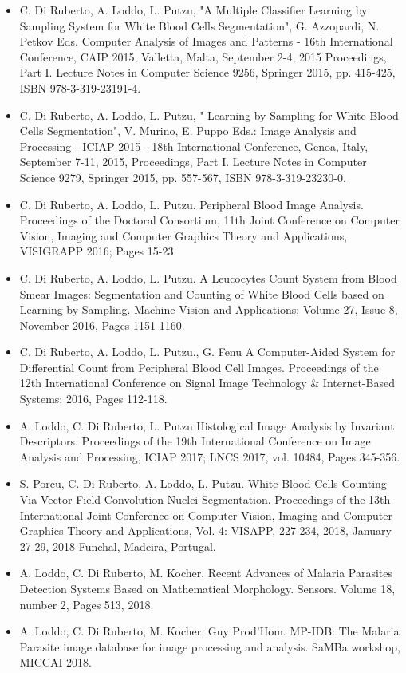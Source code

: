 \documentclass[final,a4paper,12pt,english]{UnicaPhdThesis3}
\begin{document}
\begin{itemize}
\item C. Di Ruberto, A. Loddo, L. Putzu, "A Multiple Classifier Learning by Sampling System for White Blood Cells Segmentation", G. Azzopardi, N. Petkov Eds. Computer Analysis of Images and Patterns - 16th International Conference, CAIP 2015, Valletta, Malta, September 2-4, 2015 Proceedings, Part I. Lecture Notes in Computer Science 9256, Springer 2015, pp. 415-425, ISBN 978-3-319-23191-4.
\item C. Di Ruberto, A. Loddo, L. Putzu, " Learning by Sampling for White Blood Cells Segmentation", V. Murino, E. Puppo Eds.: Image Analysis and Processing - ICIAP 2015 - 18th International Conference, Genoa, Italy, September 7-11, 2015, Proceedings, Part I. Lecture Notes in Computer Science 9279, Springer 2015, pp. 557-567,  ISBN 978-3-319-23230-0. 
\item C. Di Ruberto, A. Loddo, L. Putzu. Peripheral Blood Image Analysis. Proceedings of the Doctoral Consortium, 11th Joint Conference on Computer Vision, Imaging and Computer Graphics Theory and Applications, VISIGRAPP 2016; Pages 15-23.
\item C. Di Ruberto, A. Loddo, L. Putzu. A Leucocytes Count System from Blood Smear Images: Segmentation and Counting of White Blood Cells based on Learning by Sampling. Machine Vision and Applications; Volume 27, Issue 8, November 2016, Pages 1151-1160.
\item C. Di Ruberto, A. Loddo, L. Putzu., G. Fenu A Computer-Aided System for Differential Count from Peripheral Blood Cell Images. Proceedings of the 12th International Conference on Signal Image Technology \& Internet-Based Systems; 2016, Pages 112-118.
\item A. Loddo, C. Di Ruberto, L. Putzu Histological Image Analysis by Invariant Descriptors. Proceedings of the 19th International Conference on Image Analysis and Processing, ICIAP 2017; LNCS 2017, vol. 10484, Pages 345-356.
\item S. Porcu, C. Di Ruberto, A. Loddo, L. Putzu. White Blood Cells Counting Via Vector Field Convolution Nuclei Segmentation. Proceedings of the 13th International Joint Conference on Computer Vision, Imaging and Computer Graphics Theory and Applications, Vol. 4: VISAPP, 227-234, 2018, January 27-29, 2018 Funchal, Madeira, Portugal.
\item A. Loddo, C. Di Ruberto, M. Kocher. Recent Advances of Malaria Parasites Detection Systems Based on Mathematical Morphology. Sensors. Volume 18, number 2, Pages 513, 2018.
\item A. Loddo, C. Di Ruberto, M. Kocher, Guy Prod'Hom. MP-IDB: The Malaria Parasite image database for image processing and analysis. SaMBa workshop, MICCAI 2018.
\end{itemize}
\end{document}
